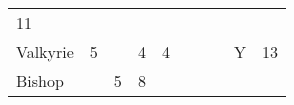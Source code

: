 \documentclass[12pt]{article}
\begin{document}
\begin{longtable}[]{@{}llllllllll@{}}
\begin{minipage}[t]{0.08\columnwidth}\raggedright\strut
11
\strut\end{minipage}\tabularnewline
\begin{minipage}[t]{0.13\columnwidth}\raggedright\strut
Valkyrie
\strut\end{minipage} &
\begin{minipage}[t]{0.06\columnwidth}\raggedright\strut
5
\strut\end{minipage} &
\begin{minipage}[t]{0.06\columnwidth}\raggedright\strut
\strut\end{minipage} &
\begin{minipage}[t]{0.06\columnwidth}\raggedright\strut
4
\strut\end{minipage} &
\begin{minipage}[t]{0.06\columnwidth}\raggedright\strut
4
\strut\end{minipage} &
\begin{minipage}[t]{0.06\columnwidth}\raggedright\strut
\strut\end{minipage} &
\begin{minipage}[t]{0.06\columnwidth}\raggedright\strut
\strut\end{minipage} &
\begin{minipage}[t]{0.06\columnwidth}\raggedright\strut
\strut\end{minipage} &
\begin{minipage}[t]{0.07\columnwidth}\raggedright\strut
Y
\strut\end{minipage} &
\begin{minipage}[t]{0.08\columnwidth}\raggedright\strut
13
\strut\end{minipage}\tabularnewline
\begin{minipage}[t]{0.13\columnwidth}\raggedright\strut
Bishop
\strut\end{minipage} &
\begin{minipage}[t]{0.06\columnwidth}\raggedright\strut
\strut\end{minipage} &
\begin{minipage}[t]{0.06\columnwidth}\raggedright\strut
5
\strut\end{minipage} &
\begin{minipage}[t]{0.06\columnwidth}\raggedright\strut
8
\strut\end{minipage} &
\begin{minipage}[t]{0.06\columnwidth}\raggedright\strut
\strut\end{minipage} &

\end{longtable}
\end{document}
